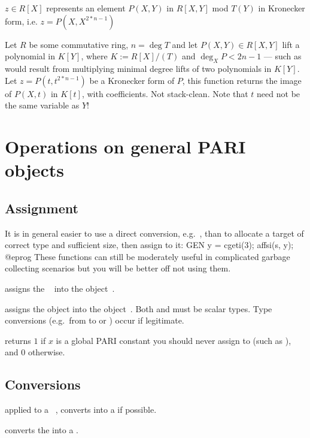  $z\in R[X]$ represents an element
$P(X,Y)$ in $R[X,Y]$ mod $T(Y)$ in Kronecker form, i.e. $z = P(X,X^{2*n-1})$

Let $R$ be some commutative ring, $n = \deg T$ and let $P(X,Y)\in R[X,Y]$ lift
a polynomial in $K[Y]$, where $K := R[X]/(T)$ and $\deg_X P < 2n-1$ --- such as
would result from multiplying minimal degree lifts of two polynomials in
$K[Y]$. Let $z = P(t,t^{2*n-1})$ be a Kronecker form of $P$, this function
returns the image of $P(X,t)$ in $K[t]$, with  coefficients.
Not stack-clean. Note that $t$ need not be the same variable as $Y$!

\newpage
\chapter{Operations on general PARI objects}

\section{Assignment}

It is in general easier to use a direct conversion,
e.g.~, than to allocate a target of correct type and
sufficient size, then assign to it:
\bprog
  GEN y = cgeti(3); affsi(s, y);
@eprog\noindent
These functions can still be moderately useful in complicated garbage
collecting scenarios but you will be better off not using them.

 assigns the ~ into the
object~.

 assigns the object  into the
object~. Both  and  must be scalar types. Type
conversions (e.g.~from  to  or ) occur if
legitimate.

 returns $1$ if $x$ is a global PARI
constant you should never assign to (such as ), and $0$
otherwise.

\section{Conversions}


 applied to a ~, converts 
into a  if possible.

 converts the   into a
.

